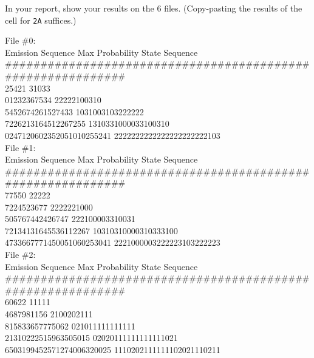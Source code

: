In your report, show your results on the 6 files. (Copy-pasting the results of the cell for \texttt{2A} suffices.)
\begin{solution}
File \#0:\\
Emission Sequence             Max Probability State Sequence\\
\footnotesize\#\#\#\#\#\#\#\#\#\#\#\#\#\#\#\#\#\#\#\#\#\#\#\#\#\#\#\#\#\#\#\#\#\#\#\#\#\#\#\#\#\#\#\#\#\#\#\#\#\#\#\#\#\#\#\#\#\#\#\#\\
25421                         31033          \\               
01232367534                   22222100310    \\               
5452674261527433              1031003103222222       \\       
7226213164512267255           1310331000033100310      \\     
0247120602352051010255241     2222222222222222222222103    \\ 

File \#1:\\
Emission Sequence             Max Probability State Sequence\\
\footnotesize\#\#\#\#\#\#\#\#\#\#\#\#\#\#\#\#\#\#\#\#\#\#\#\#\#\#\#\#\#\#\#\#\#\#\#\#\#\#\#\#\#\#\#\#\#\#\#\#\#\#\#\#\#\#\#\#\#\#\#\#\\
77550                         22222      \\                   
7224523677                    2222221000 \\                   
505767442426747               222100003310031        \\       
72134131645536112267          10310310000310333100     \\     
4733667771450051060253041     2221000003222223103222223  \\   

File \#2:\\
Emission Sequence             Max Probability State Sequence\\
\footnotesize\#\#\#\#\#\#\#\#\#\#\#\#\#\#\#\#\#\#\#\#\#\#\#\#\#\#\#\#\#\#\#\#\#\#\#\#\#\#\#\#\#\#\#\#\#\#\#\#\#\#\#\#\#\#\#\#\#\#\#\#\\
60622                         11111     \\                    
4687981156                    2100202111          \\          
815833657775062               021011111111111          \\     
21310222515963505015          02020111111111111021        \\  
6503199452571274006320025     1110202111111102021110211     \\


\end{solution}
